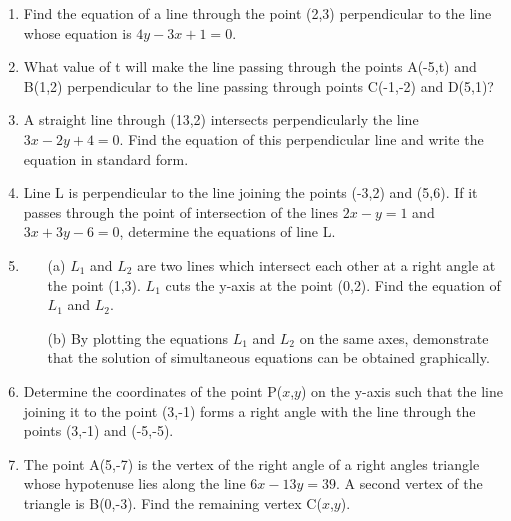 \begin{enumerate}
	\item Find the equation of a line through the point (2,3) perpendicular to the line whose equation is $4y - 3x + 1 = 0$.
	
	\item What value of t will make the line passing through the points A(-5,t) and B(1,2) perpendicular to the line passing through points C(-1,-2) and D(5,1)?
	
	\item A straight line through (13,2) intersects perpendicularly the line $3x - 2y + 4 = 0$. Find the equation of this perpendicular line and write the equation in standard form.
	
	\item Line L is perpendicular to the line joining the points (-3,2) and (5,6). If it passes through the point of intersection of the lines $2x - y = 1$ and $3x + 3y - 6 = 0$, determine the equations of line L.
	
	\item 
	\begin{itemize}
	\item[(a)] $L_1$ and $L_2$ are two lines which intersect each other at a right angle at the point (1,3). $L_1$ cuts the y-axis at the point (0,2). Find the equation of $L_1$ and $L_2$.
	\item[(b)] By plotting the equations $L_1$ and $L_2$ on the same axes, demonstrate that the solution of simultaneous equations can be obtained graphically.
	\end{itemize}
	
	\item Determine the coordinates of the point P($x$,$y$) on the y-axis such that the line joining it to the point (3,-1) forms a right angle with the line through the points (3,-1) and (-5,-5).	
	
	\item The point A(5,-7) is the vertex of the right angle of a right angles triangle whose hypotenuse lies along the line $6x - 13y = 39$. A second vertex of the triangle is B(0,-3). Find the remaining vertex C($x$,$y$).	
	




\end{enumerate}	
	

